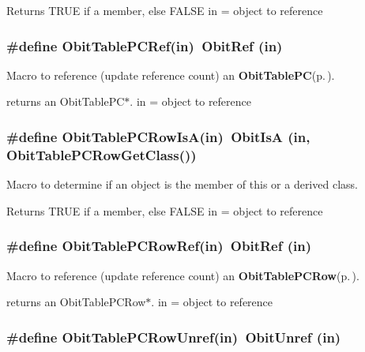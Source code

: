 Returns TRUE if a member, else FALSE in = object to reference 
\subsubsection{\setlength{\rightskip}{0pt plus 5cm}\#define Obit\-Table\-PCRef(in)\ Obit\-Ref (in)}\label{ObitTablePC_8h_a2}


Macro to reference (update reference count) an {\bf Obit\-Table\-PC}{\rm (p.\,\pageref{structObitTablePC})}. 

returns an Obit\-Table\-PC$\ast$. in = object to reference 
\subsubsection{\setlength{\rightskip}{0pt plus 5cm}\#define Obit\-Table\-PCRow\-Is\-A(in)\ Obit\-Is\-A (in, Obit\-Table\-PCRow\-Get\-Class())}\label{ObitTablePC_8h_a6}


Macro to determine if an object is the member of this or a derived class. 

Returns TRUE if a member, else FALSE in = object to reference 
\subsubsection{\setlength{\rightskip}{0pt plus 5cm}\#define Obit\-Table\-PCRow\-Ref(in)\ Obit\-Ref (in)}\label{ObitTablePC_8h_a5}


Macro to reference (update reference count) an {\bf Obit\-Table\-PCRow}{\rm (p.\,\pageref{structObitTablePCRow})}. 

returns an Obit\-Table\-PCRow$\ast$. in = object to reference 
\subsubsection{\setlength{\rightskip}{0pt plus 5cm}\#define Obit\-Table\-PCRow\-Unref(in)\ Obit\-Unref (in)}\label{ObitTablePC_8h_a4}


